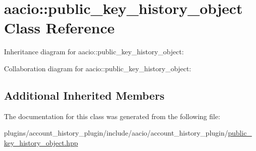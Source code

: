 \hypertarget{classaacio_1_1public__key__history__object}{}\section{aacio\+:\+:public\+\_\+key\+\_\+history\+\_\+object Class Reference}
\label{classaacio_1_1public__key__history__object}


Inheritance diagram for aacio\+:\+:public\+\_\+key\+\_\+history\+\_\+object\+:


Collaboration diagram for aacio\+:\+:public\+\_\+key\+\_\+history\+\_\+object\+:
\subsection*{Additional Inherited Members}


The documentation for this class was generated from the following file\+:\begin{DoxyCompactItemize}
\item 
plugins/account\+\_\+history\+\_\+plugin/include/aacio/account\+\_\+history\+\_\+plugin/\mbox{\hyperlink{public__key__history__object_8hpp}{public\+\_\+key\+\_\+history\+\_\+object.\+hpp}}\end{DoxyCompactItemize}
